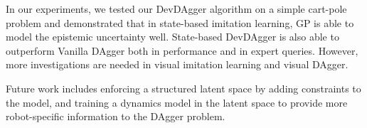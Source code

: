 \documentclass[11pt, reqno, letterpaper, twoside]{amsart}
\begin{document}
In our experiments, we tested our DevDAgger algorithm on a simple cart-pole
problem and demonstrated that in state-based imitation learning, GP is able to
model the epistemic uncertainty well. State-based DevDAgger is also able to
outperform Vanilla DAgger both in performance and in expert queries. However,
more investigations are needed in visual imitation learning and visual DAgger.

Future work includes enforcing a structured latent space by adding constraints
to the model, and training a dynamics model in the latent space to provide more
robot-specific information to the DAgger problem.

\clearpage
{
	
	
}
\end{document}
